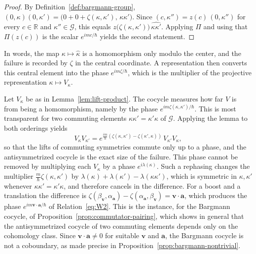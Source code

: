 \begin{proof}
	By Definition~\ref{def:bargmann-group}, $(0,\kappa)(0,\kappa')=\big(0+0+\zeta(\kappa,\kappa'),\,\kappa\kappa'\big)$. Since $(c,\kappa'')=z(c)\,(0,\kappa'')$ for every $c\in\mathbb{R}$ and $\kappa''\in\mathcal{G}$, this equals $z\big(\zeta(\kappa,\kappa')\big)\,\widehat{\kappa\kappa'}$. Applying $\Pi$ and using that $\Pi(z(c))$ is the scalar $e^{imc/\hbar}$ yields the second statement.
\end{proof}

\noindent In words, the map $\kappa\mapsto\hat\kappa$ is a homomorphism only modulo the center, and the failure is recorded by $\zeta$ in the central coordinate. A representation then converts this central element into the phase $e^{im\zeta/\hbar}$, which is the multiplier of the projective representation $\kappa\mapsto V_\kappa$.

\begin{remark}\label{rem:cocycle-meaning}
	Let $V_\kappa$ be as in Lemma~\ref{lem:lift-product}. The cocycle measures how far $V$ is from being a homomorphism, namely by the phase $e^{im\zeta(\kappa,\kappa')/\hbar}$. This is most transparent for two commuting elements $\kappa\kappa'=\kappa'\kappa$ of $\mathcal{G}$. Applying the lemma to both orderings yields
	\begin{equation*}
		V_\kappa V_{\kappa'}=e^{\frac{im}{\hbar}\left(\zeta(\kappa,\kappa')-\zeta(\kappa',\kappa)\right)}\,V_{\kappa'}V_\kappa,
	\end{equation*}
	so that the lifts of commuting symmetries commute only up to a phase, and the antisymmetrized cocycle is the exact size of the failure. This phase cannot be removed by multiplying each $V_\kappa$ by a phase $e^{i\lambda(\kappa)}$. Such a rephasing changes the multiplier $\frac{m}{\hbar}\zeta(\kappa,\kappa')$ by $\lambda(\kappa)+\lambda(\kappa')-\lambda(\kappa\kappa')$, which is symmetric in $\kappa,\kappa'$ whenever $\kappa\kappa'=\kappa'\kappa$, and therefore cancels in the difference. For a boost and a translation the difference is $\zeta(\beta_{\mathbf{v}},\alpha_{\mathbf{a}})-\zeta(\alpha_{\mathbf{a}},\beta_{\mathbf{v}})=\mathbf{v}\cdot\mathbf{a}$, which produces the phase $e^{im\mathbf{v}\cdot\mathbf{a}/\hbar}$ of Relation~\eqref{eq:W2}. This is the instance, for the Bargmann cocycle, of Proposition~\ref{prop:commutator-pairing}, which shows in general that the antisymmetrized cocycle of two commuting elements depends only on the cohomology class. Since $\mathbf{v}\cdot\mathbf{a}\neq0$ for suitable $\mathbf{v}$ and $\mathbf{a}$, the Bargmann cocycle is not a coboundary, as made precise in Proposition~\ref{prop:bargmann-nontrivial}.
\end{remark}

